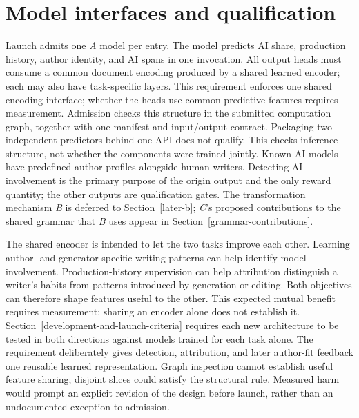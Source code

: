 \section{Model interfaces and qualification}\label{model-interfaces-and-starter-architectures}

Launch admits one \textit{A} model per entry. The model predicts AI share,
production history, author identity, and AI spans in one invocation. All output heads
must consume a common document encoding produced by a shared learned encoder;
each may also have task-specific layers. This requirement enforces one shared
encoding interface; whether the heads use common predictive features requires
measurement. Admission checks this structure in the
submitted computation graph, together with one manifest and input/output
contract. Packaging two independent predictors behind one API does not qualify.
This checks inference structure, not whether the components were trained jointly.
Known AI models have predefined author profiles alongside human
writers. Detecting AI involvement is the primary purpose of the origin output
and the only reward quantity; the other outputs are qualification gates. The
transformation mechanism \textit{B} is deferred to Section~\ref{later-b};
\textit{C}'s proposed contributions to the shared grammar that \textit{B} uses
appear in Section~\ref{grammar-contributions}.

The shared encoder is intended to let the two tasks improve each other.
Learning author- and generator-specific writing patterns can help identify
model involvement. Production-history supervision can help attribution
distinguish a writer's habits from patterns introduced by generation or
editing. Both objectives can therefore shape features useful to the other.
This expected mutual benefit requires measurement: sharing an encoder alone
does not establish it. Section~\ref{development-and-launch-criteria} requires
each new architecture to be tested in both directions against models trained
for each task alone.
The requirement deliberately gives detection, attribution, and later author-fit
feedback one reusable learned representation. Graph inspection cannot establish
useful feature sharing; disjoint slices could satisfy the structural rule.
Measured harm would prompt an explicit revision of the design before launch,
rather than an undocumented exception to admission.

